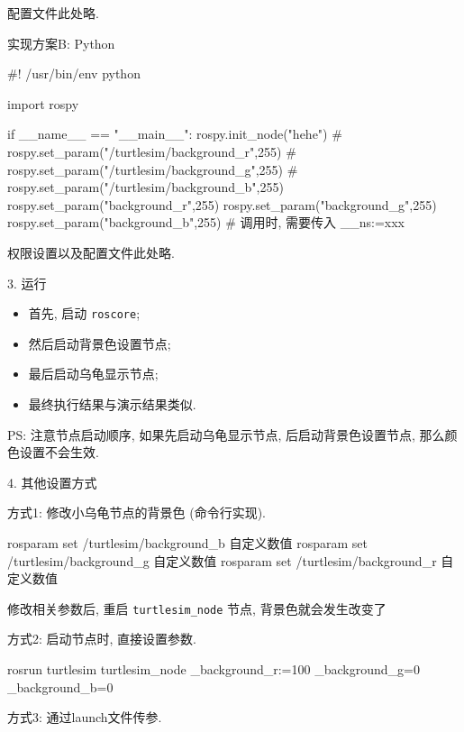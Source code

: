 \documentclass[openany, fontset=windowsold]{ctexbook}
\theoremstyle{kaiti}
\theoremstyle{normal}
\begin{document}
配置文件此处略.

实现方案B: Python

\begin{python}
  #! /usr/bin/env python

  import rospy

  if __name__ == "__main__":
      rospy.init_node("hehe")
      # rospy.set_param("/turtlesim/background_r",255)
      # rospy.set_param("/turtlesim/background_g",255)
      # rospy.set_param("/turtlesim/background_b",255)
      rospy.set_param("background_r",255)
      rospy.set_param("background_g",255)
      rospy.set_param("background_b",255)  # 调用时, 需要传入 __ns:=xxx
\end{python}

权限设置以及配置文件此处略.

3. 运行

\begin{itemize}
  \item 首先, 启动 \verb|roscore|;
  \item 然后启动背景色设置节点; 
  \item 最后启动乌龟显示节点; 
  \item 最终执行结果与演示结果类似.
\end{itemize}

PS: 注意节点启动顺序, 如果先启动乌龟显示节点, 后启动背景色设置节点, 那么颜色设置不会生效.

4. 其他设置方式

方式1: 修改小乌龟节点的背景色 (命令行实现).

\begin{bash}
  rosparam set /turtlesim/background_b 自定义数值
  rosparam set /turtlesim/background_g 自定义数值
  rosparam set /turtlesim/background_r 自定义数值
\end{bash}

修改相关参数后, 重启 \verb|turtlesim_node| 节点, 背景色就会发生改变了

方式2: 启动节点时, 直接设置参数.

\begin{bash}
  rosrun turtlesim turtlesim_node _background_r:=100 _background_g=0 _background_b=0
\end{bash}

方式3: 通过launch文件传参.

\end{document}
